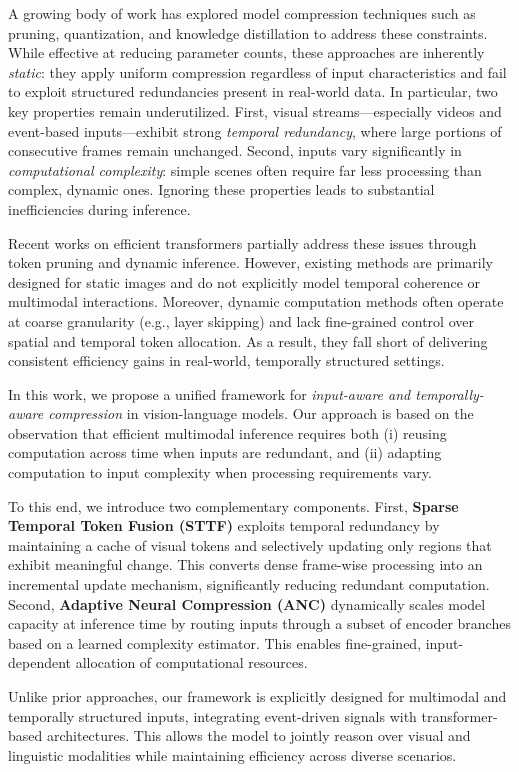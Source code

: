 \documentclass{article}
\begin{document}
A growing body of work has explored model compression techniques such as pruning, quantization, and knowledge distillation to address these constraints. While effective at reducing parameter counts, these approaches are inherently \emph{static}: they apply uniform compression regardless of input characteristics and fail to exploit structured redundancies present in real-world data. In particular, two key properties remain underutilized. First, visual streams—especially videos and event-based inputs—exhibit strong \emph{temporal redundancy}, where large portions of consecutive frames remain unchanged. Second, inputs vary significantly in \emph{computational complexity}: simple scenes often require far less processing than complex, dynamic ones. Ignoring these properties leads to substantial inefficiencies during inference.

Recent works on efficient transformers partially address these issues through token pruning and dynamic inference. However, existing methods are primarily designed for static images and do not explicitly model temporal coherence or multimodal interactions. Moreover, dynamic computation methods often operate at coarse granularity (e.g., layer skipping) and lack fine-grained control over spatial and temporal token allocation. As a result, they fall short of delivering consistent efficiency gains in real-world, temporally structured settings.

In this work, we propose a unified framework for \emph{input-aware and temporally-aware compression} in vision-language models. Our approach is based on the observation that efficient multimodal inference requires both (i) reusing computation across time when inputs are redundant, and (ii) adapting computation to input complexity when processing requirements vary.

To this end, we introduce two complementary components. First, \textbf{Sparse Temporal Token Fusion (STTF)} exploits temporal redundancy by maintaining a cache of visual tokens and selectively updating only regions that exhibit meaningful change. This converts dense frame-wise processing into an incremental update mechanism, significantly reducing redundant computation. Second, \textbf{Adaptive Neural Compression (ANC)} dynamically scales model capacity at inference time by routing inputs through a subset of encoder branches based on a learned complexity estimator. This enables fine-grained, input-dependent allocation of computational resources.

Unlike prior approaches, our framework is explicitly designed for multimodal and temporally structured inputs, integrating event-driven signals with transformer-based architectures. This allows the model to jointly reason over visual and linguistic modalities while maintaining efficiency across diverse scenarios.
\end{document}
